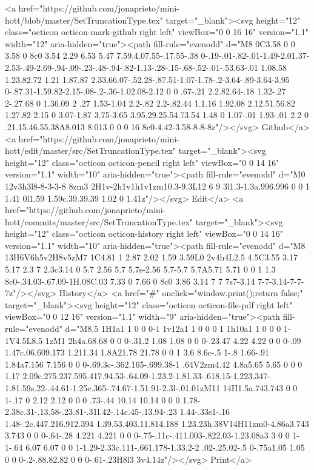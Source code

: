       <a href="https://github.com/jonaprieto/mini-hott/blob/master/SetTruncationType.tex" target="_blank"><svg height="12" class="octicon octicon-mark-github right left" viewBox="0 0 16 16" version="1.1" width="12" aria-hidden="true"><path fill-rule="evenodd" d="M8 0C3.58 0 0 3.58 0 8c0 3.54 2.29 6.53 5.47 7.59.4.07.55-.17.55-.38 0-.19-.01-.82-.01-1.49-2.01.37-2.53-.49-2.69-.94-.09-.23-.48-.94-.82-1.13-.28-.15-.68-.52-.01-.53.63-.01 1.08.58 1.23.82.72 1.21 1.87.87 2.33.66.07-.52.28-.87.51-1.07-1.78-.2-3.64-.89-3.64-3.95 0-.87.31-1.59.82-2.15-.08-.2-.36-1.02.08-2.12 0 0 .67-.21 2.2.82.64-.18 1.32-.27 2-.27.68 0 1.36.09 2 .27 1.53-1.04 2.2-.82 2.2-.82.44 1.1.16 1.92.08 2.12.51.56.82 1.27.82 2.15 0 3.07-1.87 3.75-3.65 3.95.29.25.54.73.54 1.48 0 1.07-.01 1.93-.01 2.2 0 .21.15.46.55.38A8.013 8.013 0 0 0 16 8c0-4.42-3.58-8-8-8z"/></svg> Github</a>
      <a href="https://github.com/jonaprieto/mini-hott/edit/master/src/SetTruncationType.tex" target="_blank"><svg height="12" class="octicon octicon-pencil right left" viewBox="0 0 14 16" version="1.1" width="10" aria-hidden="true"><path fill-rule="evenodd" d="M0 12v3h3l8-8-3-3-8 8zm3 2H1v-2h1v1h1v1zm10.3-9.3L12 6 9 3l1.3-1.3a.996.996 0 0 1 1.41 0l1.59 1.59c.39.39.39 1.02 0 1.41z"/></svg> Edit</a>
      <a href="https://github.com/jonaprieto/mini-hott/commits/master/src/SetTruncationType.tex" target="_blank"><svg height="12" class="octicon octicon-history right left" viewBox="0 0 14 16" version="1.1" width="10" aria-hidden="true"><path fill-rule="evenodd" d="M8 13H6V6h5v2H8v5zM7 1C4.81 1 2.87 2.02 1.59 3.59L0 2v4h4L2.5 4.5C3.55 3.17 5.17 2.3 7 2.3c3.14 0 5.7 2.56 5.7 5.7s-2.56 5.7-5.7 5.7A5.71 5.71 0 0 1 1.3 8c0-.34.03-.67.09-1H.08C.03 7.33 0 7.66 0 8c0 3.86 3.14 7 7 7s7-3.14 7-7-3.14-7-7-7z"/></svg> History</a>
      <a  href="#" onclick="window.print();return false;" target="_blank"><svg height="12" class="octicon octicon-file-pdf right left" viewBox="0 0 12 16" version="1.1" width="9" aria-hidden="true"><path fill-rule="evenodd" d="M8.5 1H1a1 1 0 0 0-1 1v12a1 1 0 0 0 1 1h10a1 1 0 0 0 1-1V4.5L8.5 1zM1 2h4a.68.68 0 0 0-.31.2 1.08 1.08 0 0 0-.23.47 4.22 4.22 0 0 0-.09 1.47c.06.609.173 1.211.34 1.8A21.78 21.78 0 0 1 3.6 8.6c-.5 1-.8 1.66-.91 1.84a7.156 7.156 0 0 0-.69.3c-.362.165-.699.38-1 .64V2zm4.42 4.8a5.65 5.65 0 0 0 1.17 2.09c.275.237.595.417.94.53-.64.09-1.23.2-1.81.33-.618.15-1.223.347-1.81.59s.22-.44.61-1.25c.365-.74.67-1.51.91-2.3l-.01.01zM11 14H1.5a.743.743 0 0 1-.17 0 2.12 2.12 0 0 0 .73-.44 10.14 10.14 0 0 0 1.78-2.38c.31-.13.58-.23.81-.31l.42-.14c.45-.13.94-.23 1.44-.33s1-.16 1.48-.2c.447.216.912.394 1.39.53.403.11.814.188 1.23.23h.38V14H11zm0-4.86a3.743 3.743 0 0 0-.64-.28 4.221 4.221 0 0 0-.75-.11c-.411.003-.822.03-1.23.08a3 3 0 0 1-1-.64 6.07 6.07 0 0 1-1.29-2.33c.111-.661.178-1.33.2-2 .02-.25.02-.5 0-.75a1.05 1.05 0 0 0-.2-.88.82.82 0 0 0-.61-.23H8l3 3v4.14z"/></svg> Print</a>
